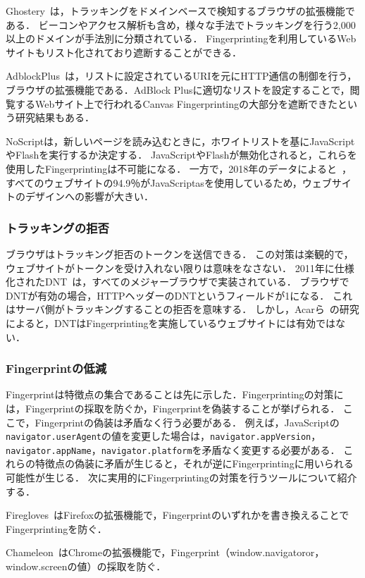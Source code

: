 Ghostery~\cite{Ghostery}は，トラッキングをドメインベースで検知するブラウザの拡張機能である．
ビーコンやアクセス解析も含め，様々な手法でトラッキングを行う2,000以上のドメインが手法別に分類されている．
Fingerprintingを利用しているWebサイトもリスト化されており遮断することができる．

AdblockPlus~\cite{acar2014web}は，リストに設定されているURIを元にHTTP通信の制御を行う，ブラウザの拡張機能である．AdBlock Plusに適切なリストを設定することで，閲覧するWebサイト上で行われるCanvas Fingerprintingの大部分を遮断できたという研究結果もある．

NoScriptは，新しいページを読み込むときに，ホワイトリストを基にJavaScriptやFlashを実行するか決定する．
JavaScriptやFlashが無効化されると，これらを使用したFingerprintingは不可能になる．
一方で，2018年のデータによると~\cite{javascript_usage}，すべてのウェブサイトの94.9％がJavaScriptasを使用しているため，ウェブサイトのデザインへの影響が大きい．
\subsubsection{トラッキングの拒否}
ブラウザはトラッキング拒否のトークンを送信できる．
この対策は楽観的で，ウェブサイトがトークンを受け入れない限りは意味をなさない．
2011年に仕様化されたDNT~\cite{dnt}は，すべてのメジャーブラウザで実装されている．
ブラウザでDNTが有効の場合，HTTPヘッダーのDNTというフィールドが1になる．
これはサーバ側がトラッキングすることの拒否を意味する．
しかし，Acarら~\cite{acar2013fpdetective}の研究によると，DNTはFingerprintingを実施しているウェブサイトには有効ではない．
\subsubsection{Fingerprintの低減}
Fingerprintは特徴点の集合であることは先に示した．Fingerprintingの対策には，Fingerprintの採取を防ぐか，Fingerprintを偽装することが挙げられる．
ここで，Fingerprintの偽装は矛盾なく行う必要がある．
例えば，JavaScriptの\texttt{navigator.userAgent}の値を変更した場合は，\texttt{navigator.appVersion}，\texttt{navigator.appName}，\texttt{navigator.platform}を矛盾なく変更する必要がある．
これらの特徴点の偽装に矛盾が生じると，それが逆にFingerprintingに用いられる可能性が生じる．
次に実用的にFingerprintingの対策を行うツールについて紹介する．

Firegloves~\cite{firegloves}はFirefoxの拡張機能で，Fingerprintのいずれかを書き換えることでFingerprintingを防ぐ．

Chameleon~\cite{chamereon}はChromeの拡張機能で，Fingerprint（window.navigatoror，window.screenの値）の採取を防ぐ．

